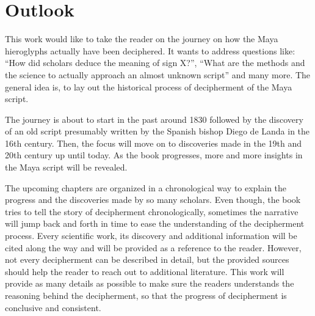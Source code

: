 \documentclass[../main.tex]{subfiles}
\begin{document}
\section{Outlook}
This work would like to take the reader on the journey on how the Maya hieroglyphs actually 
have been deciphered.
It wants to address questions like: \enquote{How did scholars deduce the meaning of sign X?},
\enquote{What are the methods and the science to actually approach an almost unknown script}
and many more.
The general idea is, to lay out the historical process of decipherment of the Maya script.

The journey is about to start in the past around 1830
followed by the discovery of an old script presumably written by the Spanish bishop Diego de Landa 
in the 16th century.
Then, the focus will move on to discoveries made in the 19th and 20th century up until today.
As the book progresses, more and more insights in the Maya script will be revealed.

The upcoming chapters are organized in a chronological way to explain the progress and the 
discoveries made by so many scholars.
Even though, the book tries to tell the story of decipherment chronologically, sometimes
the narrative will jump back and forth in time to ease the understanding of 
the decipherment process.
Every scientific work, its discovery and additional information will be cited along the way and 
will be provided as a reference to the reader.
However, not every decipherment can be described in detail, but the provided sources should help 
the reader to reach out to additional literature.
This work will provide as many details as possible to make sure the readers understands the 
reasoning behind the decipherment, so that the progress of decipherment is 
conclusive and consistent.
\end{document}
